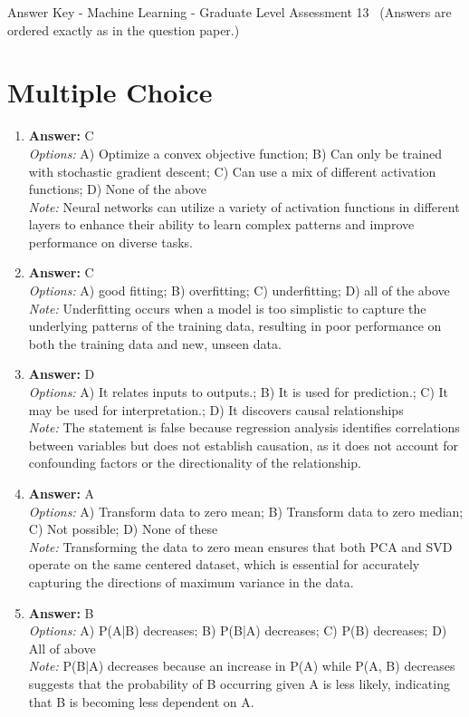 \documentclass[12pt]{article}
\begin{document}
\begin{center}
Answer Key - Machine Learning - Graduate Level Assessment 13 \
\small (Answers are ordered exactly as in the question paper.)
\end{center}

\section*{Multiple Choice}
\begin{enumerate}[label=\arabic*.]
\item \textbf{Answer:} C
\\ \textit{Options:} A) Optimize a convex objective function; B) Can only be trained with stochastic gradient descent; C) Can use a mix of different activation functions; D) None of the above
\\ \textit{Note:} Neural networks can utilize a variety of activation functions in different layers to enhance their ability to learn complex patterns and improve performance on diverse tasks.
\item \textbf{Answer:} C
\\ \textit{Options:} A) good fitting; B) overfitting; C) underfitting; D) all of the above
\\ \textit{Note:} Underfitting occurs when a model is too simplistic to capture the underlying patterns of the training data, resulting in poor performance on both the training data and new, unseen data.
\item \textbf{Answer:} D
\\ \textit{Options:} A) It relates inputs to outputs.; B) It is used for prediction.; C) It may be used for interpretation.; D) It discovers causal relationships
\\ \textit{Note:} The statement is false because regression analysis identifies correlations between variables but does not establish causation, as it does not account for confounding factors or the directionality of the relationship.
\item \textbf{Answer:} A
\\ \textit{Options:} A) Transform data to zero mean; B) Transform data to zero median; C) Not possible; D) None of these
\\ \textit{Note:} Transforming the data to zero mean ensures that both PCA and SVD operate on the same centered dataset, which is essential for accurately capturing the directions of maximum variance in the data.
\item \textbf{Answer:} B
\\ \textit{Options:} A) P(A|B) decreases; B) P(B|A) decreases; C) P(B) decreases; D) All of above
\\ \textit{Note:} P(B|A) decreases because an increase in P(A) while P(A, B) decreases suggests that the probability of B occurring given A is less likely, indicating that B is becoming less dependent on A.
\end{enumerate}
\end{document}
